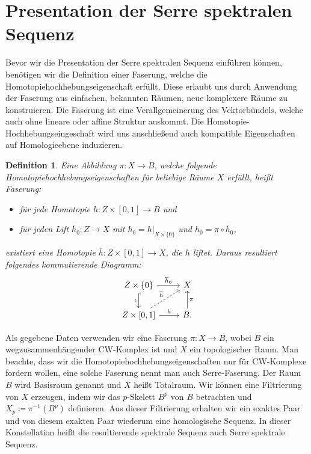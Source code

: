 \documentclass[12pt, hidelinks]{article}
\numberwithin{conj}{section}
\newtheorem{definition}[conj]{Definition}
\begin{document}
\section{Presentation der Serre spektralen Sequenz}
Bevor wir die Presentation der Serre spektralen Sequenz einführen können, benötigen wir die Definition einer Faserung, welche die Homotopiehochhebungseigenschaft erfüllt. Diese erlaubt uns durch Anwendung der Faserung aus einfachen, bekannten Räumen, neue komplexere Räume zu konstruieren. Die Faserung ist eine Verallgemeinerung des Vektorbündels, welche auch ohne lineare oder affine Struktur auskommt. Die Homotopie-Hochhebungseingeschaft wird uns anschließend auch kompatible Eigenschaften auf Homologieebene induzieren.

\begin{definition}
Eine Abbildung $\pi: X \to B$, welche folgende Homotopiehochhebungseigenschaften für beliebige Räume $X$ erfüllt, heißt Faserung:
\begin{itemize}[noitemsep]
    \item für jede Homotopie $h: Z \times [0,1] \to B$ und
    \item für jeden Lift $\overline{h}_0: Z \to X$ mit $h_0 = h\vert_{X\times \{0\}}$ und $h_0 = \pi \circ \overline{h}_0$,
\end{itemize}
existiert eine Homotopie $\overline{h}: Z \times [0,1] \to X$, die $h$ liftet. Daraus resultiert folgendes kommutierende Diagramm:
\[\begin{tikzcd}
    {Z \times \{0\}} & X \\
    {Z\times[0,1]} & B.
    \arrow["{\overline{h}_0}", from=1-1, to=1-2]
    \arrow["\iota"', hook, from=1-1, to=2-1]
    \arrow["{\overline{h}}", dashed, from=2-1, to=1-2]
    \arrow["h", from=2-1, to=2-2]
    \arrow["\pi"', from=2-2, to=1-2]
\end{tikzcd}\]
\end{definition}
Als gegebene Daten verwenden wir eine Faserung $\pi: X \to B$, wobei $B$ ein wegzusammenhängender CW-Komplex ist und $X$ ein topologischer Raum. Man beachte, dass wir die Homotopiehochhebungseigenschaften nur für CW-Komplexe fordern wollen, eine solche Faserung nennt man auch Serre-Faserung. Der Raum $B$ wird Basisraum genannt und $X$ heißt Totalraum. Wir können eine Filtrierung von $X$ erzeugen, indem wir das $p$-Skelett $B^p$ von $B$ betrachten und $X_p \coloneq \pi^{-1}(B^p)$ definieren. Aus dieser Filtrierung erhalten wir ein exaktes Paar und von diesem exakten Paar wiederum eine homologische Sequenz. In dieser Konstellation heißt die resultierende spektrale Sequenz auch Serre spektrale Sequenz.
\end{document}
